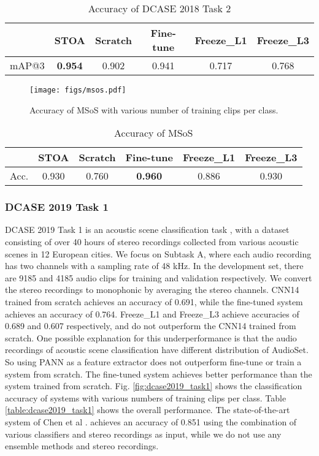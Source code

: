 \documentclass[journal]{IEEEtran}
\begin{document}
\begin{table}[t!]
\centering
\caption{Accuracy of DCASE 2018 Task 2}
\label{table:dcase2018_task2}
\begin{tabular}{*{6}{c}}
 \toprule
 & STOA \cite{jeong2018audio} & Scratch & Fine-tune & Freeze\_L1 & Freeze\_L3 \\
 \midrule
 mAP@3 & \textbf{0.954} & 0.902 & 0.941 & 0.717 & 0.768 \\
 \bottomrule
\end{tabular}
\end{table}

\begin{figure}[t]
  \centering
  \centerline{\texttt{[image: figs/msos.pdf]}}
  \caption{Accuracy of MSoS with various number of training clips per class.}
  \label{fig:msos}
\end{figure}

\begin{table}[t]
\centering
\caption{Accuracy of MSoS}
\label{table:msos}
\begin{tabular}{*{6}{c}}
 \toprule
 & STOA \cite{chenattention} & Scratch & Fine-tune & Freeze\_L1 & Freeze\_L3 \\
 \midrule
 Acc. & 0.930 & 0.760 & \textbf{0.960} & 0.886 & 0.930 \\
 \bottomrule
\end{tabular}
\end{table}

\subsubsection{DCASE 2019 Task 1}
DCASE 2019 Task 1 is an acoustic scene classification task \cite{mesaros2018multi}, with a dataset consisting of over 40 hours of stereo recordings collected from various acoustic scenes in 12 European cities. We focus on Subtask A, where each audio recording has two channels with a sampling rate of 48 kHz. In the development set, there are 9185 and 4185 audio clips for training and validation respectively. We convert the stereo recordings to monophonic by averaging the stereo channels. CNN14 trained from scratch achieves an accuracy of 0.691, while the fine-tuned system achieves an accuracy of 0.764. Freeze\_L1 and Freeze\_L3 achieve accuracies of 0.689 and 0.607 respectively, and do not outperform the CNN14 trained from scratch. One possible explanation for this underperformance is that the audio recordings of acoustic scene classification have different distribution of AudioSet. So using PANN as a feature extractor does not outperform fine-tune or train a system from scratch. The fine-tuned system achieves better performance than the system trained from scratch. Fig. \ref{fig:dcase2019_task1} shows the classification accuracy of systems with various numbers of training clips per class. Table \ref{table:dcase2019_task1} shows the overall performance. The state-of-the-art system of Chen et al \cite{chen2019integrating}. achieves an accuracy of 0.851 using the combination of various classifiers and stereo recordings as input, while we do not use any ensemble methods and stereo recordings.
\end{document}
